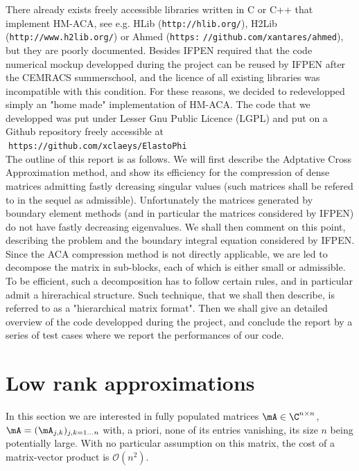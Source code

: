 There already exists freely accessible libraries written in C or C++ that implement HM-ACA, see e.g. HLib (\verb?http://hlib.org/?), H2Lib 
(\verb?http://www.h2lib.org/?) or Ahmed (\verb?https:? \verb?//github.com/xantares/ahmed?),  but they are poorly documented. Besides IFPEN required 
that the code numerical mockup developped during the project can be reused by IFPEN after the CEMRACS summerschool, 
and the licence of all existing libraries was incompatible with this condition. For these reasons, we decided to redevelopped simply  
an "home made" implementation of HM-ACA. The code that we developped was put under Lesser Gnu Public Licence (LGPL) and 
put on a Github repository freely accessible at\\[10pt]
\textcolor{white}{.}\hspace{4cm}\verb?https://github.com/xclaeys/ElastoPhi?\\[10pt]
The outline of this report is as follows. We will first describe the Adptative Cross Approximation method, and show its efficiency 
for the compression of dense matrices admitting fastly dcreasing singular values (such matrices shall be refered to in the sequel as admissible). 
Unfortunately the matrices generated by boundary element  methods (and in particular the matrices considered by IFPEN) do not have 
fastly decreasing eigenvalues. We shall then comment on this point, describing the problem and the boundary integral equation 
considered by IFPEN. Since the ACA compression method is not directly applicable, we are led to decompose the matrix in sub-blocks, 
each of which is either small or admissible. To be efficient, such a decomposition has to follow certain rules, and in particular 
admit a hirerachical structure. Such technique, that we shall then describe, is referred to as a "hierarchical matrix format". 
Then we shall give an detailed overview of the code developped during the project, and conclude the report by a series of test 
cases where we report the performances of our code.

\section{Low rank approximations}

In this section we are interested in fully populated matrices $\mA\in \C^{n\times n}$, $\mA = (\mA_{j,k})_{j,k=1\dots n}$ with, a priori, 
none of its entries vanishing, its size $n$ being potentially large. With no particular assumption on this matrix, the cost of a 
matrix-vector product is $\mathcal{O}(n^{2})$. 

